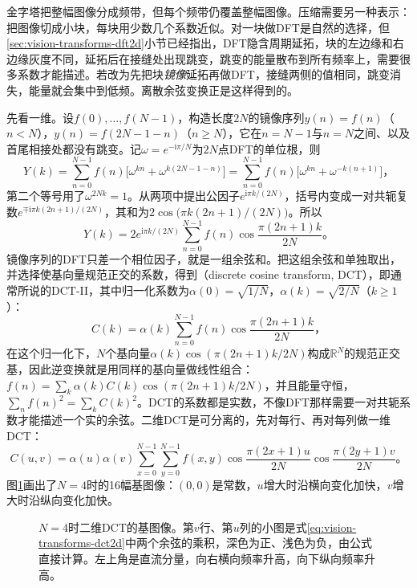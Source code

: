 金字塔把整幅图像分成频带，但每个频带仍覆盖整幅图像。压缩需要另一种表示：把图像切成小块，每块用少数几个系数近似。对一块做DFT是自然的选择，但\ref{sec:vision-transforms-dft2d}小节已经指出，DFT隐含周期延拓，块的左边缘和右边缘灰度不同，延拓后在接缝处出现跳变，跳变的能量散布到所有频率上，需要很多系数才能描述。若改为先把块\emph{镜像}延拓再做DFT，接缝两侧的值相同，跳变消失，能量就会集中到低频。离散余弦变换正是这样得到的。

先看一维。设$f(0),\ldots,f(N-1)$，构造长度$2N$的镜像序列$y(n)=f(n)$（$n<N$），$y(n)=f(2N-1-n)$（$n\geq N$），它在$n=N-1$与$n=N$之间、以及首尾相接处都没有跳变。记$\omega=e^{-\mathrm{i}\pi/N}$为$2N$点DFT的单位根，则
\[
  Y(k)=\sum_{n=0}^{N-1}f(n)\bigl[\omega^{kn}+\omega^{k(2N-1-n)}\bigr]
  =\sum_{n=0}^{N-1}f(n)\bigl[\omega^{kn}+\omega^{-k(n+1)}\bigr]\text{，}
\]
第二个等号用了$\omega^{2Nk}=1$。从两项中提出公因子$e^{\mathrm{i}\pi k/(2N)}$，括号内变成一对共轭复数$e^{\mp\mathrm{i}\pi k(2n+1)/(2N)}$，其和为$2\cos\bigl(\pi k(2n+1)/(2N)\bigr)$。所以
\[
  Y(k)=2e^{\mathrm{i}\pi k/(2N)}\sum_{n=0}^{N-1}f(n)\cos\frac{\pi(2n+1)k}{2N}\text{。}
\]
镜像序列的DFT只差一个相位因子，就是一组余弦和。把这组余弦和单独取出，并选择使基向量规范正交的系数，得到（discrete cosine transform, DCT），即通常所说的DCT-II，其中归一化系数为$\alpha(0)=\sqrt{1/N}$，$\alpha(k)=\sqrt{2/N}$（$k\geq1$）：
\begin{equation}
  C(k)=\alpha(k)\sum_{n=0}^{N-1}f(n)\cos\frac{\pi(2n+1)k}{2N}\text{，}
  \label{eq:vision-transforms-dct}
\end{equation}
在这个归一化下，$N$个基向量$\alpha(k)\cos(\pi(2n+1)k/2N)$构成$\mathbb{R}^N$的规范正交基，因此逆变换就是用同样的基向量做线性组合：$f(n)=\sum_k\alpha(k)C(k)\cos(\pi(2n+1)k/2N)$，并且能量守恒，$\sum_nf(n)^2=\sum_kC(k)^2$。DCT的系数都是实数，不像DFT那样需要一对共轭系数才能描述一个实的余弦。二维DCT是可分离的，先对每行、再对每列做一维DCT：
\begin{equation}
  C(u,v)=\alpha(u)\alpha(v)\sum_{x=0}^{N-1}\sum_{y=0}^{N-1}f(x,y)
  \cos\frac{\pi(2x+1)u}{2N}\cos\frac{\pi(2y+1)v}{2N}\text{。}
  \label{eq:vision-transforms-dct2d}
\end{equation}
图\ref{fig:vision-transforms-dct-basis}画出了$N=4$时的16幅基图像：$(0,0)$是常数，$u$增大时沿横向变化加快，$v$增大时沿纵向变化加快。

\begin{figure}[htbp]
  \centering
  
  \caption{$N=4$时二维DCT的基图像。第$v$行、第$u$列的小图是式\eqref{eq:vision-transforms-dct2d}中两个余弦的乘积，深色为正、浅色为负，由公式直接计算。左上角是直流分量，向右横向频率升高，向下纵向频率升高。}
  \label{fig:vision-transforms-dct-basis}
\end{figure}

